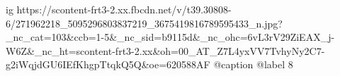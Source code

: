  
 
 
 
 

\ifcmt
  ig https://scontent-frt3-2.xx.fbcdn.net/v/t39.30808-6/271962218_5095296803837219_3675419816789595433_n.jpg?_nc_cat=103&ccb=1-5&_nc_sid=b9115d&_nc_ohc=6vL3rV29ZiEAX_j-W6Z&_nc_ht=scontent-frt3-2.xx&oh=00_AT_Z7L4yxVV7TvhyNy2C7-g2iWqjdGU6IEfKhgpTtqkQ5Q&oe=620588AF
  @caption @label 8
\fi
